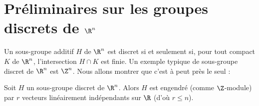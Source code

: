 \documentclass[11pt, %
  title in boldface,
  theorem in new line,
  theorem numbering = section,
  number theorems separately,
  simple name,
]{beaulivre}
\begin{document}
\section{Préliminaires sur les groupes discrets de \texorpdfstring{\( \R^n \)}{R\textasciicircum n}}\label{sec:préliminaires sur les groupes discrets de R n}

    Un sous-groupe additif \( H \) de \( \R^n \) est discret si et seulement si, pour tout compact \( K \) de \( \R^n \), l'intersection \( H \cap K \) est finie. Un exemple typique de sous-groupe discret de \( \R^n \) est \( \Z^n \). Nous allons montrer que c'est à peut près le seul :
    \begin{theorem}\label{thm:structure d'un réseau sur R}
        Soit \( H \) un sous-groupe discret de \( \R^n \). Alors \( H \) est engendré (comme \( \Z \)‑module) par \( r \) vecteurs linéairement indépendants sur \( \R \) (d'où \( r \leqslant n \)).
    \end{theorem}
\end{document}
